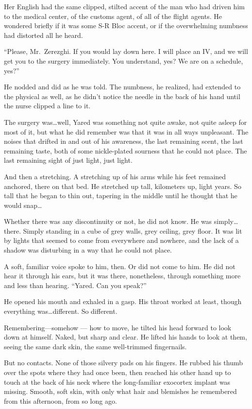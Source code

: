 Her English had the same clipped, stilted accent of the man who had driven him to the medical center, of the customs agent, of all of the flight agents. He wondered briefly if it was some S-R Bloc accent, or if the overwhelming numbness had distorted all he heard.

``Please, Mr.~Zerezghi. If you would lay down here. I will place an IV, and we will get you to the surgery immediately. You understand, yes? We are on a schedule, yes?''

He nodded and did as he was told. The numbness, he realized, had extended to the physical as well, as he didn't notice the needle in the back of his hand until the nurse clipped a line to it.

The surgery was\ldots well, Yared was something not quite awake, not quite asleep for most of it, but what he did remember was that it was in all ways unpleasant. The noises that drifted in and out of his awareness, the last remaining scent, the last remaining taste, both of some nickle-plated sourness that he could not place. The last remaining sight of just light, just light.

And then a stretching. A stretching up of his arms while his feet remained anchored, there on that bed. He stretched up tall, kilometers up, light years. So tall that he began to thin out, tapering in the middle until he thought that he would snap\ldots{}

Whether there was any discontinuity or not, he did not know. He was simply\ldots there. Simply standing in a cube of grey walls, grey ceiling, grey floor. It was lit by lights that seemed to come from everywhere and nowhere, and the lack of a shadow was disturbing in a way that he could not place.

A soft, familiar voice spoke to him, then. Or did not come to him. He did not hear it through his ears, but it was there, nonetheless, through something more and less than hearing. ``Yared. Can you speak?''

He opened his mouth and exhaled in a gasp. His throat worked at least, though everything was\ldots different. So different.

Remembering---somehow — how to move, he tilted his head forward to look down at himself. Naked, but sharp and clear. He lifted his hands to look at them, seeing the same dark skin, the same well-trimmed fingernails.

But no contacts. None of those silvery pads on his fingers. He rubbed his thumb over the spots where they had once been, then reached his other hand up to touch at the back of his neck where the long-familiar exocortex implant was missing. Smooth, soft skin, with only what hair and blemishes he remembered from this afternoon, from so long ago.

